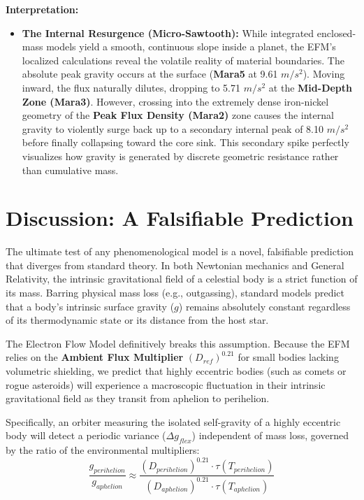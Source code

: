 \documentclass[11pt, a4paper]{article}
\begin{document}
\textbf{Interpretation:} 
\begin{itemize}
    \item \textbf{The Internal Resurgence (Micro-Sawtooth):} While integrated enclosed-mass models yield a smooth, continuous slope inside a planet, the EFM's localized calculations reveal the volatile reality of material boundaries. The absolute peak gravity occurs at the surface (\textbf{Mara5} at 9.61 $m/s^2$). Moving inward, the flux naturally dilutes, dropping to 5.71 $m/s^2$ at the \textbf{Mid-Depth Zone (Mara3)}. However, crossing into the extremely dense iron-nickel geometry of the \textbf{Peak Flux Density (Mara2)} zone causes the internal gravity to violently surge back up to a secondary internal peak of 8.10 $m/s^2$ before finally collapsing toward the core sink. This secondary spike perfectly visualizes how gravity is generated by discrete geometric resistance rather than cumulative mass.
\end{itemize}

\clearpage
\section{Discussion: A Falsifiable Prediction}

The ultimate test of any phenomenological model is a novel, falsifiable prediction that diverges from standard theory. In both Newtonian mechanics and General Relativity, the intrinsic gravitational field of a celestial body is a strict function of its mass. Barring physical mass loss (e.g., outgassing), standard models predict that a body's intrinsic surface gravity ($g$) remains absolutely constant regardless of its thermodynamic state or its distance from the host star.

The Electron Flow Model definitively breaks this assumption. Because the EFM relies on the \textbf{Ambient Flux Multiplier} $(D_{ref})^{0.21}$ for small bodies lacking volumetric shielding, we predict that highly eccentric bodies (such as comets or rogue asteroids) will experience a macroscopic fluctuation in their intrinsic gravitational field as they transit from aphelion to perihelion. 

Specifically, an orbiter measuring the isolated self-gravity of a highly eccentric body will detect a periodic variance ($\Delta g_{flex}$) independent of mass loss, governed by the ratio of the environmental multipliers:
$$ \frac{g_{perihelion}}{g_{aphelion}} \approx \frac{(D_{perihelion})^{0.21} \cdot \tau(T_{perihelion})}{(D_{aphelion})^{0.21} \cdot \tau(T_{aphelion})} $$
\end{document}
